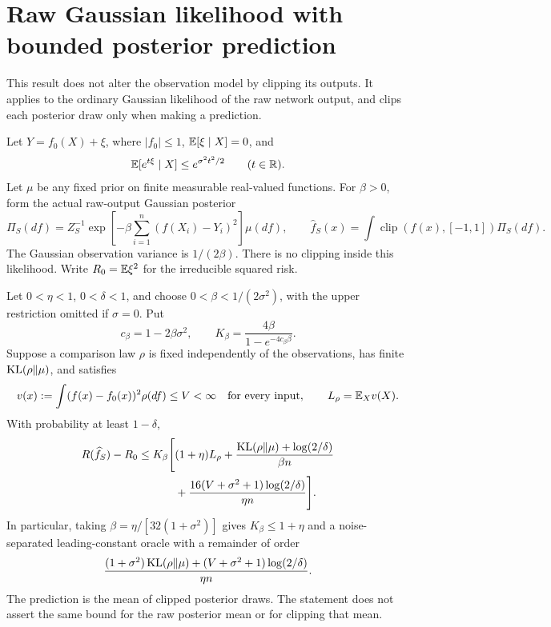 \section{Raw Gaussian likelihood with bounded posterior prediction}
\label{sec:raw-likelihood-clipped-prediction}
This result does not alter the observation model by clipping its outputs. It applies to the ordinary Gaussian likelihood of the raw network output, and clips each posterior draw only when making a prediction.

Let $Y=f_0(X)+\xi$, where $|f_0|\le1$, $\mathbb E[\xi\mid X]=0$, and
\[
 \mathbb E[e^{t\xi}\mid X]\le e^{\sigma^2t^2/2}\qquad(t\in\mathbb R).
\]
Let $\mu$ be any fixed prior on finite measurable real-valued functions. For $\beta>0$, form the actual raw-output Gaussian posterior
\[
 \Pi_S(df)=Z_S^{-1}\exp\left[-\beta\sum_{i=1}^n(f(X_i)-Y_i)^2\right]\mu(df),
 \qquad
 \widehat f_S(x)=\int\operatorname{clip}(f(x),[-1,1])\Pi_S(df).
\]
The Gaussian observation variance is $1/(2\beta)$. There is no clipping inside this likelihood. Write $R_0=\mathbb E\xi^2$ for the irreducible squared risk.

\begin{theorem}
\label{thm:raw-likelihood-comparison}
Let $0<\eta<1$, $0<\delta<1$, and choose $0<\beta<1/(2\sigma^2)$, with the upper restriction omitted if $\sigma=0$. Put
\[
 c_\beta=1-2\beta\sigma^2,\qquad
 K_\beta=\frac{4\beta}{1-e^{-4c_\beta\beta}}.
\]
Suppose a comparison law $\rho$ is fixed independently of the observations, has finite $\operatorname{KL}(\rho\|\mu)$, and satisfies
\[
 v(x):=\int(f(x)-f_0(x))^2\rho(df)\le V<\infty
 \quad\hbox{for every input},\qquad
 L_\rho=\mathbb E_Xv(X).
\]
With probability at least $1-\delta$,
\begin{align*}
 R(\widehat f_S)-R_0\le K_\beta\Bigg[
 &(1+\eta)L_\rho+\frac{\operatorname{KL}(\rho\|\mu)+\log(2/\delta)}{\beta n}\\
 &+\frac{16(V+\sigma^2+1)\log(2/\delta)}{\eta n}\Bigg].
\end{align*}
In particular, taking $\beta=\eta/[32(1+\sigma^2)]$ gives $K_\beta\le1+\eta$ and a noise-separated leading-constant oracle with a remainder of order
\[
 \frac{(1+\sigma^2)\operatorname{KL}(\rho\|\mu)
       +(V+\sigma^2+1)\log(2/\delta)}{\eta n}.
\]
The prediction is the mean of clipped posterior draws. The statement does not assert the same bound for the raw posterior mean or for clipping that mean.
\end{theorem}

